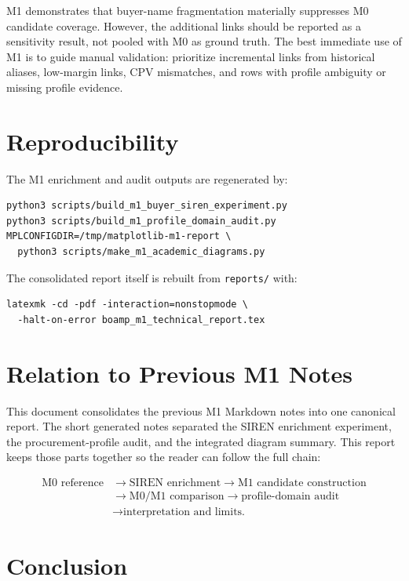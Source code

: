 \documentclass[11pt]{article}
\begin{document}
M1 demonstrates that buyer-name fragmentation materially suppresses M0
candidate coverage. However, the additional links should be reported as a
sensitivity result, not pooled with M0 as ground truth. The best immediate
use of M1 is to guide manual validation: prioritize incremental links from
historical aliases, low-margin links, CPV mismatches, and rows with profile
ambiguity or missing profile evidence.

\section{Reproducibility}
\label{sec:repro}

The M1 enrichment and audit outputs are regenerated by:

\begin{verbatim}
python3 scripts/build_m1_buyer_siren_experiment.py
python3 scripts/build_m1_profile_domain_audit.py
MPLCONFIGDIR=/tmp/matplotlib-m1-report \
  python3 scripts/make_m1_academic_diagrams.py
\end{verbatim}

The consolidated report itself is rebuilt from \texttt{reports/} with:

\begin{verbatim}
latexmk -cd -pdf -interaction=nonstopmode \
  -halt-on-error boamp_m1_technical_report.tex
\end{verbatim}

\section{Relation to Previous M1 Notes}
\label{sec:relation}

This document consolidates the previous M1 Markdown notes into one
canonical report. The short generated notes separated the SIREN enrichment
experiment, the procurement-profile audit, and the integrated diagram
summary. This report keeps those parts together so the reader can follow
the full chain:

\[
\begin{aligned}
\text{M0 reference}
&\rightarrow \text{SIREN enrichment}
\rightarrow \text{M1 candidate construction}\\
&\rightarrow \text{M0/M1 comparison}
\rightarrow \text{profile-domain audit}\\
&\rightarrow \text{interpretation and limits.}
\end{aligned}
\]

\section{Conclusion}
\label{sec:conclusion}
\end{document}
